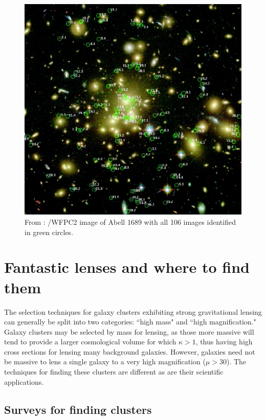 \begin{figure}
\centering
\includegraphics[width=\textwidth]{Intro/a1689.jpg}
\caption[Abell 1689]{From \citet{Broadhurst:2005qy}: \hst/WFPC2 image of Abell 1689 with all 106 images identified in green circles.}
\label{intro:fig:a1689}
\end{figure}

\section{Fantastic lenses and where to find them}

The selection techniques for galaxy clusters exhibiting strong gravitational lensing can generally be split into two categories: ``high mass" and ``high magnification." Galaxy clusters may be selected by mass for lensing, as those more massive will tend to provide a larger cosmological volume for which $\kappa>1$, thus having high cross sections for lensing many background galaxies. However, galaxies need not be massive to lens a single galaxy to a very high magnification ($\mu>30$). The techniques for finding these clusters are different as are their scientific applications.

\subsection{Surveys for finding clusters}


